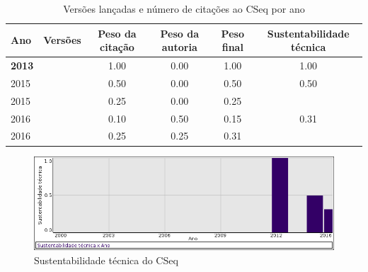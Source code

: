 \begin{table}[H]
\caption{Versões lançadas e número de citações ao CSeq por ano}
\centering
\begin{tabular}{| l | c | c | c | c | c |}
  \hline
  Ano & Versões & Peso da citação & Peso da autoria & Peso final & Sustentabilidade técnica \\
  \hline
            {\bf 2013}
          &
          
          &
          1.00
          &
          0.00
          &
          1.00
          &
            {\color{blue} 1.00}
          \\
\hline
            2015
          &
          
          &
          0.50
          &
          0.00
          &
          0.50
          &
            {\color{blue} 0.50}
          \\
            2015
          &
          
          &
          0.25
          &
          0.00
          &
          0.25
          &
          \\
\hline
            2016
          &
          
          &
          0.10
          &
          0.50
          &
          0.15
          &
            {\color{red} 0.31}
          \\
            2016
          &
          
          &
          0.25
          &
          0.25
          &
          0.31
          &
          \\
\hline
\end{tabular}
\end{table}

\begin{figure}[h]
  \center
  \includegraphics[scale=0.50]{result-documents/charts/cseq.png}
  \caption{Sustentabilidade técnica do CSeq}
\end{figure}


